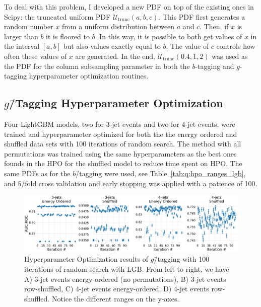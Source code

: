 To deal with this problem, I developed a new PDF on top of the existing ones in Scipy: the truncated uniform PDF $\mathcal{U}_\mathrm{trunc}(a, b, c)$. This PDF first generates a random number $x$ from a uniform distribution between $a$ and $c$. Then, if $x$ is larger than $b$ it is floored to $b$. In this way, it is possible to both get values of $x$ in the interval $[a, b]$ but also values exactly equal to $b$. The value of $c$ controls how often these  values of $x$ are generated. In the end, $\mathcal{U}_\mathrm{trunc}(0.4, 1, 2)$ was used as the PDF for the column subsampling parameter in both the $b$-tagging and $g$-tagging hyperparameter optimization routines. 

\subsection{$g$\=/Tagging Hyperparameter Optimization}

Four LightGBM models, two for 3-jet events and two for 4-jet events, were trained and hyperparameter optimized for both the the energy ordered and shuffled data sets with \num{100} iterations of random search. The method with all permutations was trained using the same hyperparameters as the best ones founds in the HPO for the shuffled model to reduce time spent on HPO. The same PDFs as for the $b$\=/tagging were used, see Table~\ref{tab:q:hpo_ranges_lgb}, and $5$\=/fold cross validation and early stopping was applied with a patience of \num{100}. 

\begin{figure}[h!]%
  \centerfloat
  \includegraphics[width=1\textwidth, trim=0 0 0 0, clip]{figures/quarks/cv_res_lgb-gtag-down_sample=1.00-ML_vars=vertex-selection=b-ejet_min=4-n_iter_RS_lgb=99-n_iter_RS_xgb=9-cdot_cut=0.90-version=19.pdf}
  \vspace{3mm}
  \caption[Hyperparameter Optimization of $g$\=/Tagging]{
    Hyperparameter Optimization results of $g$\=/tagging with \num{100} iterations of random search with LGB. From left to right, we have A) 3-jet events energy-ordered (no permutations), B) 3-jet events row-shuffled, C) 4-jet events energy-ordered, D) 4-jet events row-shuffled. Notice the different ranges on the y-axes.}
  \label{fig:q:CV_res_iterations_g_tagging}%
\end{figure}
\vspace{-3mm}

